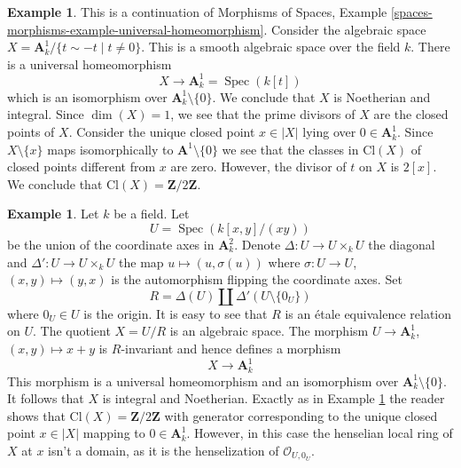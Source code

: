 \documentclass{stacks-project}
\theoremstyle{plain}
\theoremstyle{definition}
\newtheorem{example}[subsection]{Example}
\theoremstyle{remark}
\numberwithin{equation}{subsection}
\def\Spec{\mathop{\mathrm{Spec}}}
\begin{document}
\begin{example}
\label{example-Z-mod-2}
This is a continuation of Morphisms of Spaces, Example
\ref{spaces-morphisms-example-universal-homeomorphism}.
Consider the algebraic space
$X = \mathbf{A}^1_k/\{t \sim -t \mid t \not = 0\}$.
This is a smooth algebraic space over the field $k$.
There is a universal homeomorphism
$$
X \longrightarrow \mathbf{A}^1_k = \Spec(k[t])
$$
which is an isomorphism over $\mathbf{A}^1_k \setminus \{0\}$.
We conclude that $X$ is Noetherian and integral.
Since $\dim(X) = 1$, we see that the prime divisors of $X$ are
the closed points of $X$.
Consider the unique closed point $x \in |X|$ lying over $0 \in \mathbf{A}^1_k$.
Since $X \setminus \{x\}$ maps isomorphically to $\mathbf{A}^1 \setminus \{0\}$
we see that the classes in $\text{Cl}(X)$ of closed points different
from $x$ are zero. However, the divisor of $t$ on $X$ is $2[x]$.
We conclude that $\text{Cl}(X) = \mathbf{Z}/2\mathbf{Z}$.
\end{example}

\begin{example}
\label{example-not-a-domain}
Let $k$ be a field. Let
$$
U = \Spec(k[x, y]/(xy))
$$
be the union of the coordinate axes in $\mathbf{A}^2_k$.
Denote $\Delta : U \to U \times_k U$ the diagonal and
$\Delta' : U \to U \times_k U$ the map $u \mapsto (u, \sigma(u))$
where $\sigma : U \to U$, $(x, y) \mapsto (y, x)$
is the automorphism flipping the coordinate axes. Set
$$
R = \Delta(U) \amalg \Delta'(U \setminus \{0_U\})
$$
where $0_U \in U$ is the origin. It is easy to see that
$R$ is an \'etale equivalence relation on $U$. The quotient $X = U/R$
is an algebraic space. The morphism $U \to \mathbf{A}^1_k$,
$(x, y) \mapsto x + y$ is $R$-invariant and hence defines
a morphism
$$
X \longrightarrow \mathbf{A}^1_k
$$
This morphism is a universal homeomorphism and an isomorphism over
$\mathbf{A}^1_k \setminus \{0\}$. It follows that $X$ is integral
and Noetherian. Exactly as in Example \ref{example-Z-mod-2}
the reader shows that $\text{Cl}(X) = \mathbf{Z}/2\mathbf{Z}$
with generator corresponding to the unique closed point $x \in |X|$
mapping to $0 \in \mathbf{A}^1_k$. However, in this case the henselian
local ring of $X$ at $x$ isn't a domain, as it is the henselization
of $\mathcal{O}_{U, 0_U}$.
\end{example}
\end{document}
